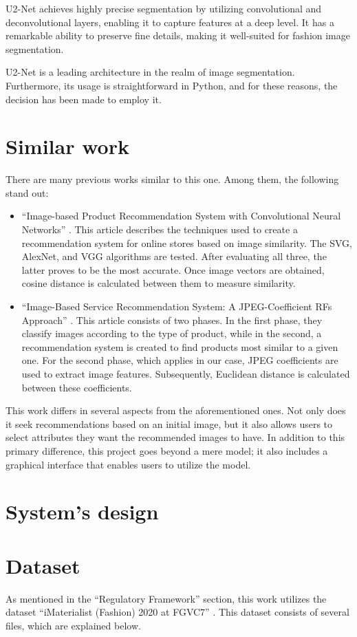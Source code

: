 \documentclass[12pt]{report} %
\begin{document}
U2-Net achieves highly precise segmentation by utilizing convolutional and deconvolutional layers, enabling it to capture features at a deep level. It has a remarkable ability to preserve fine details, making it well-suited for fashion image segmentation.

U2-Net is a leading architecture in the realm of image segmentation. Furthermore, its usage is straightforward in Python, and for these reasons, the decision has been made to employ it.
\section*{Similar work}
There are many previous works similar to this one. Among them, the following stand out:

\begin{itemize}
	\item ``Image-based Product Recommendation System with Convolutional Neural Networks'' \cite{stanford-paper}. This article describes the techniques used to create a recommendation system for online stores based on image similarity. The SVG, AlexNet, and VGG algorithms are tested. After evaluating all three, the latter proves to be the most accurate. Once image vectors are obtained, cosine distance is calculated between them to measure similarity.
	\item ``Image-Based Service Recommendation System: A JPEG-Coefficient RFs Approach'' \cite{image-based-paper}. This article consists of two phases. In the first phase, they classify images according to the type of product, while in the second, a recommendation system is created to find products most similar to a given one. For the second phase, which applies in our case, JPEG coefficients are used to extract image features. Subsequently, Euclidean distance is calculated between these coefficients.
\end{itemize}
This work differs in several aspects from the aforementioned ones. Not only does it seek recommendations based on an initial image, but it also allows users to select attributes they want the recommended images to have. In addition to this primary difference, this project goes beyond a mere model; it also includes a graphical interface that enables users to utilize the model.

\section*{System's design}
\section*{Dataset}
As mentioned in the ``Regulatory Framework'' section, this work utilizes the dataset ``iMaterialist (Fashion) 2020 at FGVC7'' \cite{imaterialist}. This dataset consists of several files, which are explained below.
\end{document}
